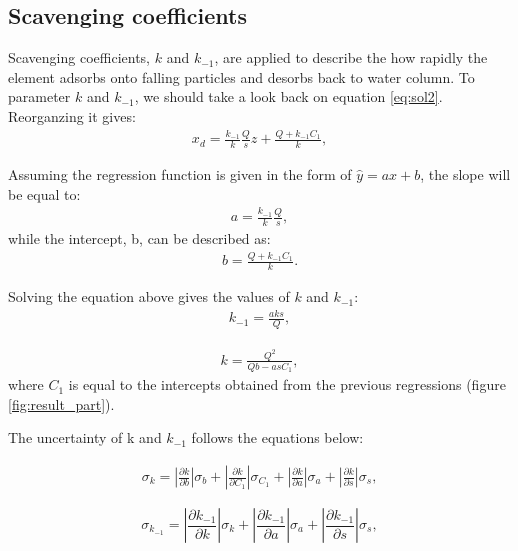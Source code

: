 \documentclass[paper=a4, fontsize=11pt]{scrartcl} %
\numberwithin{equation}{section} %
\numberwithin{figure}{section} %
\numberwithin{table}{section} %
\begin{document}
\subsection{Scavenging coefficients}

Scavenging coefficients, ${k}$ and $k_{-1}$, are applied to describe the how rapidly the element adsorbs onto falling particles and desorbs back to water column. To parameter ${k}$ and $k_{-1}$, we should take a look back on equation \ref{eq:sol2}. Reorganzing it gives:
\begin{align}
\label{eq:reorganize}
x_{d}=\frac{k_{-1}}{k}\frac{Q}{s}z+\frac{Q+k_{-1}C_{1}}{k},
\end{align}

Assuming the regression function is given in the form of $\hat{y}=ax+b$, the slope will be equal to:
\begin{align}
a=\frac{k_{-1}}{k}\frac{Q}{s},
\end{align}
while the intercept, b, can be described as:
\begin{align}
b=\frac{Q+k_{-1}C_{1}}{k}. 
\end{align}

Solving the equation above gives the values of ${k}$ and $k_{-1}$:
\begin{align}
\label{eq:para_k-1}
k_{-1}=\frac{aks}{Q},
\end{align}

\begin{align}
\label{eq:para_k}
k=\frac{Q^{2}}{Qb-asC_{1}},
\end{align}
where $C_{1}$ is equal to the intercepts obtained from the previous regressions (figure \ref{fig:result_part}). 

The uncertainty of k and $k_{-1}$ follows the equations below:

\begin{align}
\label{eq:errk}
\sigma_{k}=\left|\frac{\partial k}{\partial b}\right|\sigma_{b}+\left|\frac{\partial k}{\partial C_{1}}\right|\sigma_{C_{1}}+\left|\frac{\partial k}{\partial a}\right|\sigma_{a}+\left|\frac{\partial k}{\partial s}\right|\sigma_{s},
\end{align}

\begin{equation}
\label{eq:errk}
\sigma_{k_{-1}}=\left|\frac{\partial k_{-1}}{\partial k}\right|\sigma_{k}+\left|\frac{\partial k_{-1}}{\partial a}\right|\sigma_{a}+\left|\frac{\partial k_{-1}}{\partial s}\right|\sigma_{s},
\end{equation}
\end{document}
